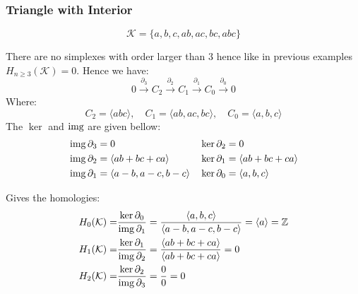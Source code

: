 \subsubsection{Triangle with Interior}
\begin{center}
\end{center}
\[\mathcal{K}=\{a,b,c,ab,ac,bc,abc\}\]

There are no simplexes with order larger than $3$ hence like in previous examples $H_{n\geq 3}(\mathcal{K}) = 0$.
Hence we have:
\[0 \stackrel{\partial_3}{\longrightarrow} C_2 \stackrel{\partial_2}{\longrightarrow} C_1 \stackrel{\partial_1}{\longrightarrow} C_0 \stackrel{\partial_0}{\longrightarrow} 0\]
Where:
\[C_2 = \langle abc \rangle,\quad C_1 = \langle ab,ac,bc \rangle,\quad C_0 = \langle a,b,c \rangle\]
The $\ker$ and $\operatorname{img}$ are given bellow:
\begin{equation*}
\begin{aligned}
	&\operatorname{img} \partial_3 = 0 && \ker \partial_2 = 0\\
	&\operatorname{img} \partial_2 = \langle ab+bc+ca\rangle && \ker \partial_1 = \langle ab+bc+ca\rangle\\
	&\operatorname{img} \partial_1 = \langle a-b,a-c,b-c\rangle && \ker \partial_0 = \langle a,b,c\rangle\\
\end{aligned}
\end{equation*}

Gives the homologies:
\begin{equation*}
\begin{aligned}
	H_0(\mathcal{K}) =& \frac{\ker\partial_0}{\operatorname{img}\partial_1} = \frac{\langle a,b,c\rangle}{\langle a-b,a-c,b-c\rangle} = \langle a\rangle = \mathbb{Z}\\
	H_1(\mathcal{K}) =& \frac{\ker\partial_1}{\operatorname{img}\partial_2} = \frac{\langle ab+bc+ca\rangle}{\langle ab+bc+ca\rangle} = 0\\
	H_2(\mathcal{K}) =& \frac{\ker\partial_2}{\operatorname{img}\partial_3} = \frac{0}{0} = 0\\
\end{aligned}
\end{equation*}

